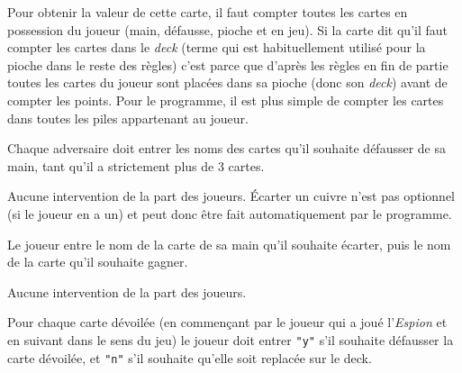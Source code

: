 \documentclass[12pt]{td}
\begin{document}
{Pour obtenir la valeur de cette carte, il faut compter toutes les cartes en possession du joueur (main, défausse, pioche et en jeu). Si la carte dit qu'il faut compter les cartes dans le \emph{deck} (terme qui est habituellement utilisé pour la pioche dans le reste des règles) c'est parce que d'après les règles en fin de partie toutes les cartes du joueur sont placées dans sa pioche (donc son \emph{deck}) avant de compter les points. Pour le programme, il est plus simple de compter les cartes dans toutes les piles appartenant au joueur.}

{Chaque adversaire doit entrer les noms des cartes qu'il souhaite défausser de sa main, tant qu'il a strictement plus de 3 cartes.}

{Aucune intervention de la part des joueurs. Écarter un cuivre n'est pas optionnel (si le joueur en a un) et peut donc être fait automatiquement par le programme.}

{Le joueur entre le nom de la carte de sa main qu'il souhaite écarter, puis le nom de la carte qu'il souhaite gagner.}

{Aucune intervention de la part des joueurs.}

{Pour chaque carte dévoilée (en commençant par le joueur qui a joué l'\emph{Espion} et en suivant dans le sens du jeu) le joueur doit entrer \texttt{"y"} s'il souhaite défausser la carte dévoilée, et \texttt{"n"} s'il souhaite qu'elle soit replacée sur le deck.}
\end{document}
